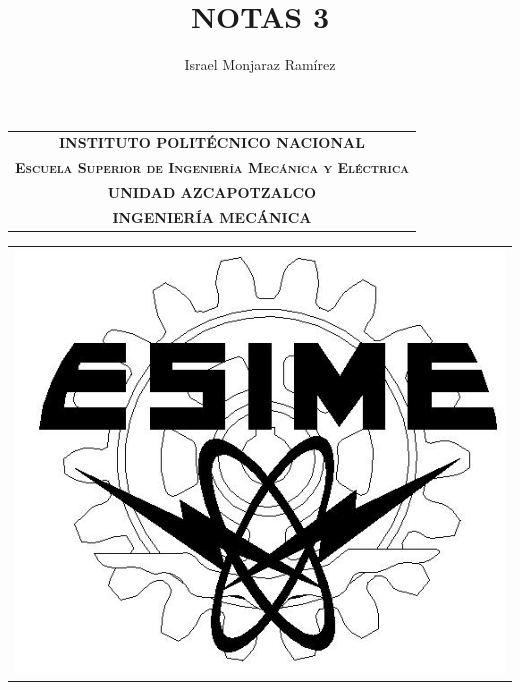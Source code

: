 \documentclass[11pt,a4paper]{article}
\author{ Israel Monjaraz Ramírez }
\title{NOTAS 3}
\begin{document}
	

	\pagestyle{empty}	 %
	
	
	
	\begin{tabular}{c}
		{\LARGE \textbf{INSTITUTO POLITÉCNICO NACIONAL}}  \\ 
		{\Large \textsc{\textbf{Escuela Superior de Ingeniería Mecánica y Eléctrica}  } } \\ 
		\textbf{UNIDAD AZCAPOTZALCO }\\ 
		\textbf{INGENIERÍA MECÁNICA} \\
	\end{tabular} 
	\begin{tabular}{c}
		\includegraphics[scale=0.20125687]{figures/esimeBN}
	\end{tabular}
	
	\lfoot[]{ }
	\cfoot[]{}
	\rfoot[]{ }
	\renewcommand{\headrulewidth}{0pt}
	
	
	
\end{document}
